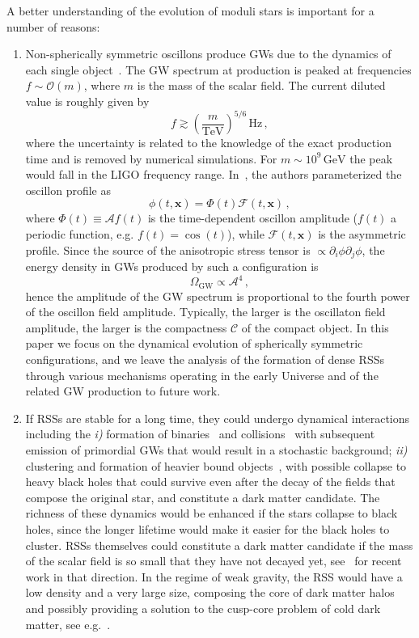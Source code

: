 \documentclass[11pt,a4paper]{article}
\begin{document}
A better understanding of the evolution of moduli stars is important for a number of reasons:
\begin{enumerate}
\item Non-spherically symmetric oscillons produce GWs due to the dynamics of each single object~\cite{Dufaux:2007pt}. The GW spectrum at production is peaked at frequencies $f \sim \mathcal{O}(m)$, where $m$ is the mass of the scalar field. The current diluted value is roughly given by
\begin{equation}
f \gtrsim \left(\frac{m}{\text{TeV}}\right)^{5/6} \, \text{Hz} \,,
\end{equation}
where the uncertainty is related to the knowledge of the exact production time and is removed by numerical simulations. For $m \sim 10^9 \, \text{GeV}$ the peak would fall in the LIGO frequency range. In~\cite{Antusch:2017vga}, the authors parameterized the oscillon profile as
\begin{equation}
\label{eq:ParametrizedProfile}
\phi(t, \mathbf{x}) = \Phi(t) \mathcal{F}(t, \mathbf{x}) \,,
\end{equation}
where $\Phi(t) \equiv \mathcal{A} f(t)$ is the time-dependent oscillon amplitude ($f(t)$ a periodic function, e.g. $f(t) = \cos(t)$), while $\mathcal{F}(t,\mathbf{x})$ is the asymmetric profile. Since the source of the anisotropic stress tensor is $\propto \partial_i \phi \partial_j \phi$, the energy density in GWs produced by such a configuration is
\begin{equation}
\label{eq:GWSpectrumAmplitude}
\Omega_{\text{GW}} \propto \mathcal{A}^4 \,,
\end{equation}
hence the amplitude of the GW spectrum is proportional to the fourth power of the oscillon field amplitude. Typically, the larger is the oscillaton field amplitude, the larger is the compactness $\mathcal{C}$ of the compact object. In this paper we focus on the dynamical evolution of spherically symmetric configurations, and we leave the analysis of the formation of dense RSSs through various mechanisms operating in the early Universe and of the related GW production to future work.
\item If RSSs are stable for a long time, they could undergo dynamical interactions including the \textit{i)} formation of binaries~\cite{Amin:2019ums} and collisions~\cite{Helfer:2018vtq} with subsequent emission of primordial GWs that would result in a stochastic background; \textit{ii)} clustering and formation of heavier bound objects~\cite{Belotsky:2018wph}, with possible collapse to heavy black holes that could survive even after the decay of the fields that compose the original star, and constitute a dark matter candidate. The richness of these dynamics would be enhanced if the stars collapse to black holes, since the longer lifetime would make it easier for the black holes to cluster. RSSs themselves could constitute a dark matter candidate if the mass of the scalar field is so small that they have not decayed yet, see~\cite{Olle:2019kbo} for recent work in that direction. In the regime of weak gravity, the RSS would have a low density and a very large size, composing the core of dark matter halos and possibly providing a solution to the cusp-core problem of cold dark matter, see e.g.~\cite{Marsh:2015wka}.

\end{enumerate}
\end{document}
